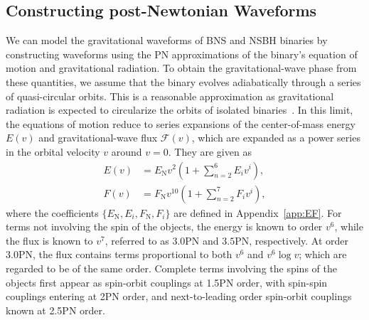 \subsection{Constructing post-Newtonian Waveforms}
\label{sec:waveforms}

We can model the gravitational waveforms of BNS and NSBH
binaries by constructing waveforms using the
\ac{PN} approximations of the binary's equation of motion and
gravitational radiation.  To obtain the gravitational-wave phase from these
quantities, we assume that the binary evolves adiabatically through a series
of quasi-circular orbits. This is a reasonable approximation as gravitational
radiation is expected to circularize the orbits of isolated
binaries~\cite{Peters:1964zz}.  In this limit, the equations of motion reduce
to series expansions of the center-of-mass energy $E(v)$ and gravitational-wave
flux $\mathcal{F}(v)$, which are expanded as a power series in the orbital
velocity $v$ around $v = 0$. They are given as
%
\begin{align}
%
E(v) &= E_{\mathrm{N}} v^2 \left(1+\sum_{n=2}^{6}E_i v^i\right), \\
%
F(v) &= F_{\mathrm{N}} v^{10} \left(1+\sum_{n=2}^{7}F_i v^i\right),
%
\end{align}
%
where the coefficients $\{E_\mathrm{N}, E_i, F_\mathrm{N}, F_i\}$ are
defined in Appendix~\ref{app:EF}.  For terms not involving the spin of the
objects, the energy is known to order $v^6$, while the flux is known to $v^7$,
referred to as $3.0$PN and $3.5$PN, respectively.  At order $3.0$PN, the flux
contains terms proportional to both $v^6$ and $v^6 \log v$; which are regarded
to be of the same order. Complete terms involving the spins of the objects first
appear as spin-orbit couplings at 1.5\ac{PN} order, with spin-spin couplings
entering at 2\ac{PN} order, and next-to-leading order spin-orbit couplings
known at 2.5\ac{PN} order. 

